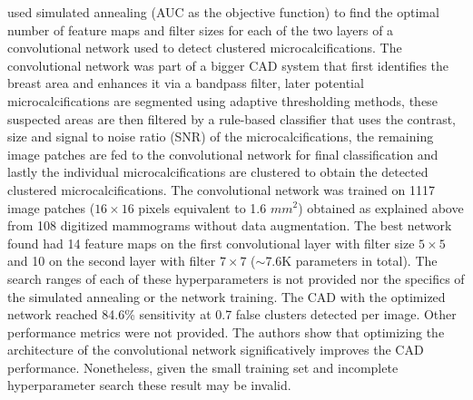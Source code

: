 \cite{Gurcan2002} used simulated annealing (AUC as the objective function) to find the optimal number of feature maps and filter sizes for each of the two layers of a convolutional network used to detect clustered microcalcifications. The convolutional network was part of a bigger CAD system that first identifies the breast area and enhances it via a bandpass filter, later potential microcalcifications are segmented using adaptive thresholding methods, these suspected areas are then filtered by a rule-based classifier that uses the contrast, size and signal to noise ratio (SNR) of the microcalcifications, the remaining image patches are fed to the convolutional network for final classification and lastly the individual microcalcifications are clustered to obtain the detected clustered microcalcifications. The convolutional network was trained on 1117 image patches ($16 \times 16$ pixels equivalent to 1.6 $mm^2$) obtained as explained above from 108 digitized mammograms without data augmentation. The best network found had 14 feature maps on the first convolutional layer with filter size $5\times 5$ and 10 on the second layer with filter $7 \times 7$ ($\sim$7.6K parameters in total). The search ranges of each of these hyperparameters is not provided nor the specifics of the simulated annealing or the network training. The CAD with the optimized network reached 84.6\% sensitivity at 0.7 false clusters detected per image. Other performance metrics were not provided. %
The authors show that optimizing the architecture of the convolutional network significatively improves the CAD performance. Nonetheless, given the small training set and incomplete hyperparameter search these result may be invalid. 






